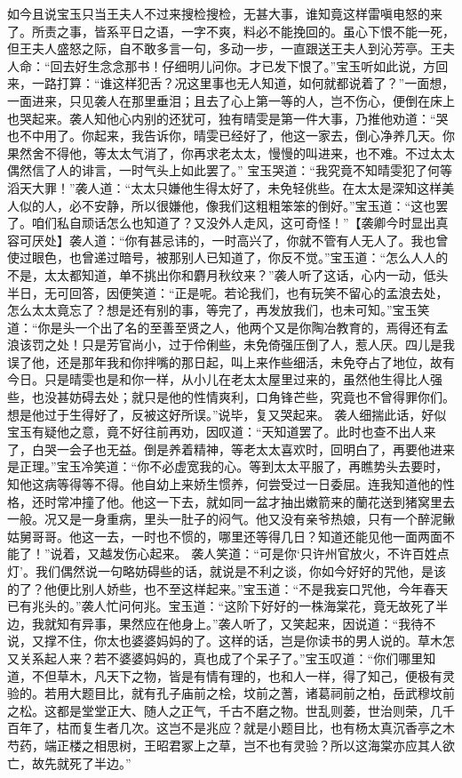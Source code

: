 \documentclass[12pt,oneside]{book}
\begin{document}
如今且说宝玉只当王夫人不过来搜检搜检，无甚大事，谁知竟这样雷嗔电怒的来了。所责之事，皆系平日之语，一字不爽，料必不能挽回的。虽心下恨不能一死，但王夫人盛怒之际，自不敢多言一句，多动一步，一直跟送王夫人到沁芳亭。王夫人命：“回去好生念念那书！仔细明儿问你。才已发下恨了。”宝玉听如此说，方回来，一路打算：“谁这样犯舌？况这里事也无人知道，如何就都说着了？”一面想，一面进来，只见袭人在那里垂泪；且去了心上第一等的人，岂不伤心，便倒在床上也哭起来。袭人知他心内别的还犹可，独有晴雯是第一件大事，乃推他劝道：“哭也不中用了。你起来，我告诉你，晴雯已经好了，他这一家去，倒心净养几天。你果然舍不得他，等太太气消了，你再求老太太，慢慢的叫进来，也不难。不过太太偶然信了人的诽言，一时气头上如此罢了。”
宝玉哭道：“我究竟不知晴雯犯了何等滔天大罪！”袭人道：“太太只嫌他生得太好了，未免轻佻些。在太太是深知这样美人似的人，必不安静，所以很嫌他，像我们这粗粗笨笨的倒好。”宝玉道：“这也罢了。咱们私自顽话怎么也知道了？又没外人走风，这可奇怪！”【袭卿今时显出真容可厌处】袭人道：“你有甚忌讳的，一时高兴了，你就不管有人无人了。我也曾使过眼色，也曾递过暗号，被那别人已知道了，你反不觉。”宝玉道：“怎么人人的不是，太太都知道，单不挑出你和麝月秋纹来？”袭人听了这话，心内一动，低头半日，无可回答，因便笑道：“正是呢。若论我们，也有玩笑不留心的孟浪去处，怎么太太竟忘了？想是还有别的事，等完了，再发放我们，也未可知。”宝玉笑道：“你是头一个出了名的至善至贤之人，他两个又是你陶冶教育的，焉得还有孟浪该罚之处！只是芳官尚小，过于伶俐些，未免倚强压倒了人，惹人厌。四儿是我误了他，还是那年我和你拌嘴的那日起，叫上来作些细活，未免夺占了地位，故有今日。只是晴雯也是和你一样，从小儿在老太太屋里过来的，虽然他生得比人强些，也没甚妨碍去处；就只是他的性情爽利，口角锋芒些，究竟也不曾得罪你们。想是他过于生得好了，反被这好所误。”说毕，复又哭起来。
袭人细揣此话，好似宝玉有疑他之意，竟不好往前再劝，因叹道：“天知道罢了。此时也查不出人来了，白哭一会子也无益。倒是养着精神，等老太太喜欢时，回明白了，再要他进来是正理。”宝玉冷笑道：“你不必虚宽我的心。等到太太平服了，再瞧势头去要时，知他这病等得等不得。他自幼上来娇生惯养，何尝受过一日委屈。连我知道他的性格，还时常冲撞了他。他这一下去，就如同一盆才抽出嫩箭来的蘭花送到猪窝里去一般。况又是一身重病，里头一肚子的闷气。他又没有亲爷热娘，只有一个醉泥鳅姑舅哥哥。他这一去，一时也不惯的，哪里还等得几日？知道还能见他一面两面不能了！”说着，又越发伤心起来。
袭人笑道：“可是你‘只许州官放火，不许百姓点灯’。我们偶然说一句略妨碍些的话，就说是不利之谈，你如今好好的咒他，是该的了？他便比别人娇些，也不至这样起来。”宝玉道：“不是我妄口咒他，今年春天已有兆头的。”袭人忙问何兆。宝玉道：“这阶下好好的一株海棠花，竟无故死了半边，我就知有异事，果然应在他身上。”袭人听了，又笑起来，因说道：“我待不说，又撑不住，你太也婆婆妈妈的了。这样的话，岂是你读书的男人说的。草木怎又关系起人来？若不婆婆妈妈的，真也成了个呆子了。”宝玉叹道：“你们哪里知道，不但草木，凡天下之物，皆是有情有理的，也和人一样，得了知己，便极有灵验的。若用大题目比，就有孔子庙前之桧，坟前之蓍，诸葛祠前之柏，岳武穆坟前之松。这都是堂堂正大、随人之正气，千古不磨之物。世乱则萎，世治则荣，几千百年了，枯而复生者几次。这岂不是兆应？就是小题目比，也有杨太真沉香亭之木芍药，端正楼之相思树，王昭君冢上之草，岂不也有灵验？所以这海棠亦应其人欲亡，故先就死了半边。”
\end{document}
